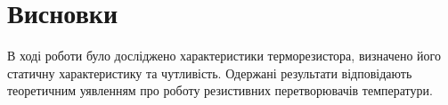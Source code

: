 \documentclass[a4paper]{article}
\begin{document}


\section*{Висновки}
В ході роботи було досліджено характеристики терморезистора, визначено його статичну характеристику та чутливість. Одержані результати відповідають теоретичним уявленням про роботу резистивних перетворювачів температури.
\end{document}
